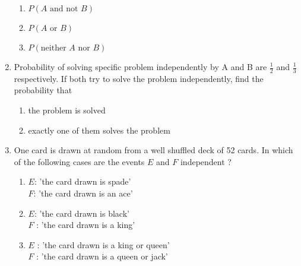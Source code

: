 \begin{enumerate}[label=\thechapter.\arabic*,ref=\thechapter.\theenumi]
\begin{enumerate}
\item $P(A \text{ and not } B)$
\item $P(A \text{ or } B)$
\item $P(\text{neither } A \text{ nor } B)$
\end{enumerate}
%
\item Probability of solving specific problem independently by A and B are $\frac{1}{2}$ and $\frac{1}{3}$ respectively. If both try to solve the problem independently, find the probability that
		\label{ncert/12/13/2/13}
\begin{enumerate}
\item the problem is solved
\item exactly one of them solves the problem
\end{enumerate}
\solution

\item One card is drawn at random from a well shuffled deck of 52 cards. In which of the following cases are the events $E$ and $F$ independent ?
		\label{ncert/12/13/2/14}
\begin{enumerate}
\item $E$: 'the card drawn is spade'\\
$F$: 'the card drawn is an ace'
\item $E$: 'the card drawn is black’\\
$F$ : 'the card drawn is a king’
\item $E$ : 'the card drawn is a king or queen’\\
$F$ : 'the card drawn is a queen or jack’
\end{enumerate}
\solution

\end{enumerate}

